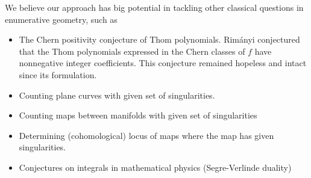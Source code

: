 \documentclass{article}
\theoremstyle{plain}
\theoremstyle{definition}
\theoremstyle{remark}
\begin{document}
We believe our approach has big potential in tackling other classical questions in enumerative geometry, such as
\begin{itemize}\itemsep-0.2em
\item The Chern positivity conjecture of Thom polynomials. Rim\'anyi \cite{rimanyi} conjectured that the Thom polynomials expressed in the Chern classes of $f$ have nonnegative integer 
coefficients. This conjecture remained hopeless and intact since its formulation. 


\item Counting plane curves with given set of singularities.
\item Counting maps between manifolds with given set of singularities
\item Determining (cohomological) locus of maps where the map has given singularities. 
\item Conjectures on integrals in mathematical physics (Segre-Verlinde duality)
\end{itemize}




\end{document}
